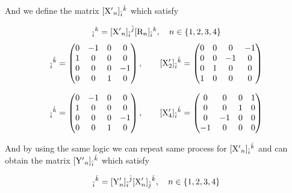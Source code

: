 \documentclass[12pt]{article}
\def\rR{{\rm R}}
\let\bm\relax
\newcommand{\bm}[1]{{\boldsymbol{#1}}}
\begin{document}
And we define the matrix $[{\bm{\rm X'}}_n]_{\hat i}{}^{\hat k}$ which satisfy

\begin{equation}
[{\bm \rR}_{n+1}]_{\hat i}{}^{k}=[\bm{\rm X'}_n]_{\hat i}{}^{\hat j}[\bm{\rm R}_n]_{\hat i}{}^{k},\quad n\in\{1,2,3,4\}
\label{eq23}
\end{equation}
\begin{equation}
[{\bm{\rm X}}'_1]_{\hat i}{}^{\hat k}=
\begin{pmatrix}
0 & -1 & 0 & 0 \\
1 & 0 & 0 & 0 \\
0 & 0 & 0 & -1 \\
0 & 0 & 1 & 0 \\
\end{pmatrix}
,\quad\quad
[{\bm{\rm X}}'_2]_{\hat i}{}^{\hat k}=
\begin{pmatrix}
0 & 0 & 0 & -1 \\
0 & 0 & -1 & 0 \\
0 & 1 & 0 & 0 \\
1 & 0 & 0 & 0 \\
\end{pmatrix}
\end{equation}

\begin{equation}
[{\bm{\rm X}}'_3]_{\hat i}{}^{\hat k}=
\begin{pmatrix}
0 & -1 & 0 & 0 \\
1 & 0 & 0 & 0 \\
0 & 0 & 0 & -1 \\
0 & 0 & 1 & 0 \\
\end{pmatrix}
,\quad\quad
[{\bm{\rm X}}'_4]_{\hat i}{}^{\hat k}=
\begin{pmatrix}
0 & 0 & 0 & 1 \\
0 & 0 & 1 & 0 \\
0 & -1 & 0 & 0 \\
-1 & 0 & 0 & 0 \\
\end{pmatrix}
\end{equation}

And by using the same logic we can repeat same process for $[{\bm{\rm X'}}_n]_{\hat i}{}^{\hat k}$ and can obtain the matrix $[{\bm{\rm Y'}}_n]_{\hat i}{}^{\hat k}$ which satisfy

\begin{equation}
[{\bm{\rm X}}'_{n+1}]_{\hat i}{}^{\hat k}=[{\bm{\rm Y}}'_n]_{\hat i}{}^{\hat j}[{\bm{\rm X}}'_n]_{\hat j}{}^{\hat k},\quad n\in\{1,2,3,4\}
\label{eq26}
\end{equation}
\end{document}
